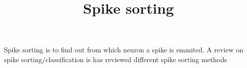 \documentclass[a4paper]{article}
\title{Spike sorting}
\date{}
\begin{document}
    \maketitle
    
    Spike sorting is to find out from which neuron a spike is emmited.
    A review on spike sorting/classification is \cite{lewicki-1998-a-review-of-methods-for-spike-sorting-the-detection-and-classification-of-neural-action-potentials} has reviewed different spike sorting methods
    
    
    
\end{document}
